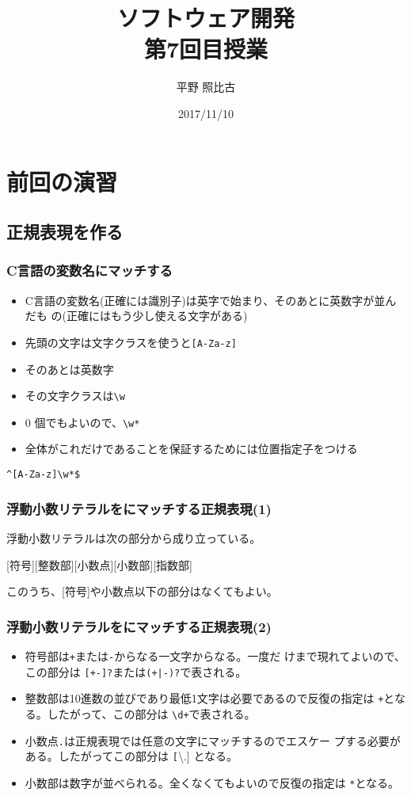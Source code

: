 
\title{ソフトウェア開発\\第7回目授業}
\author{平野 照比古}
\institute{}
\date{2017/11/10}
\newtheorem{Prob}{解説}

\frame{\maketitle}
\newcommand{\Elm}[1]{\texttt{<#1>}}
\section{前回の演習}
\subsection{正規表現を作る}
\begin{frame}[containsverbatim]
 \frametitle{C言語の変数名にマッチする}
\begin{itemize}
 \item C言語の変数名(正確には識別子)は英字で始まり、そのあとに英数字が並んだも
の(正確にはもう少し使える文字がある)
 \item 先頭の文字は文字クラスを使うと\texttt{[A-Za-z]}
 \item そのあとは英数字
 \item その文字クラスは\texttt{\textbackslash w}
 \item $0$ 個でもよいので、\texttt{\textbackslash w*}
 \item 全体がこれだけであることを保証するためには位置指定子をつける
\end{itemize}
{\LARGE
\Verb+^[A-Za-z]\w*$+}
\end{frame}
\begin{frame}[containsverbatim]
 \frametitle{浮動小数リテラルをにマッチする正規表現(1)}
浮動小数リテラルは次の部分から成り立っている。

[符号][整数部][小数点][小数部][指数部]

このうち、[符号]や小数点以下の部分はなくてもよい。

\end{frame}
\begin{frame}[containsverbatim]
 \frametitle{浮動小数リテラルをにマッチする正規表現(2)}
\begin{itemize}
 \item 符号部は\texttt{+}または\texttt{-}からなる一文字からなる。一度だ
       けまで現れてよいので、この部分は \texttt{[+-]?}または\texttt{(+|-)?}で表される。
 \item 整数部は10進数の並びであり最低1文字は必要であるので反復の指定は
       \texttt{+}となる。したがって、この部分は \texttt{\textbackslash d+}で表される。
 \item 小数点\texttt{.}は正規表現では任意の文字にマッチするのでエスケー
       プする必要がある。したがってこの部分は \texttt[\textbackslash .]
       となる。
 \item 小数部は数字が並べられる。全くなくてもよいので反復の指定は
       \texttt{*}となる。
\end{itemize}
\end{frame}
